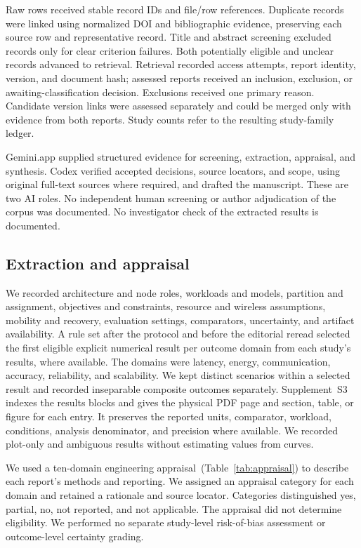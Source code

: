 \documentclass[pdflatex,sn-vancouver-num]{sn-jnl}
\begin{document}
Raw rows received stable record IDs and file/row references. Duplicate records were linked using normalized DOI and bibliographic evidence, preserving each source row and representative record. Title and abstract screening excluded records only for clear criterion failures. Both potentially eligible and unclear records advanced to retrieval. Retrieval recorded access attempts, report identity, version, and document hash; assessed reports received an inclusion, exclusion, or awaiting-classification decision. Exclusions received one primary reason. Candidate version links were assessed separately and could be merged only with evidence from both reports. Study counts refer to the resulting study-family ledger.

Gemini.app supplied structured evidence for screening, extraction, appraisal, and synthesis. Codex verified accepted decisions, source locators, and scope, using original full-text sources where required, and drafted the manuscript. These are two AI roles. No independent human screening or author adjudication of the corpus was documented. No investigator check of the extracted results is documented.

\subsection{Extraction and appraisal}\label{sec:extraction}
We recorded architecture and node roles, workloads and models, partition and assignment, objectives and constraints, resource and wireless assumptions, mobility and recovery, evaluation settings, comparators, uncertainty, and artifact availability. A rule set after the protocol and before the editorial reread selected the first eligible explicit numerical result per outcome domain from each study's results, where available. The domains were latency, energy, communication, accuracy, reliability, and scalability. We kept distinct scenarios within a selected result and recorded inseparable composite outcomes separately. Supplement~S3 indexes the results blocks and gives the physical PDF page and section, table, or figure for each entry. It preserves the reported units, comparator, workload, conditions, analysis denominator, and precision where available. We recorded plot-only and ambiguous results without estimating values from curves.

We used a ten-domain engineering appraisal~(Table~\ref{tab:appraisal}) to describe each report's methods and reporting. We assigned an appraisal category for each domain and retained a rationale and source locator. Categories distinguished yes, partial, no, not reported, and not applicable. The appraisal did not determine eligibility. We performed no separate study-level risk-of-bias assessment or outcome-level certainty grading.
\end{document}
